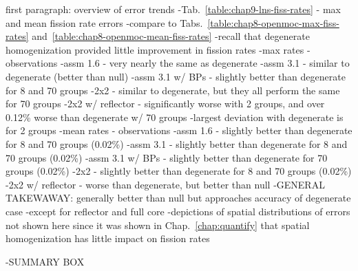 first paragraph: overview of error trends
-Tab.~\ref{table:chap9-lns-fiss-rates} - max and mean fission rate errors
  -compare to Tabs.~\ref{table:chap8-openmoc-max-fiss-rates} and~\ref{table:chap8-openmoc-mean-fiss-rates}
  -recall that degenerate homogenization provided little improvement in fission rates
-max rates - observations
  -assm 1.6 - very nearly the same as degenerate
  -assm 3.1 - similar to degenerate (better than null)
  -assm 3.1 w/ BPs - slightly better than degenerate for 8 and 70 groups
  -2x2 - similar to degenerate, but they all perform the same for 70 groups
  -2x2 w/ reflector - significantly worse with 2 groups, and over 0.12\% worse than degenerate w/ 70 groups
  -largest deviation with degenerate is for 2 groups
-mean rates - observations
  -assm 1.6 - slightly better than degenerate for 8 and 70 groups (0.02\%)
  -assm 3.1 - slightly better than degenerate for 8 and 70 groups (0.02\%)
  -assm 3.1 w/ BPs - slightly better than degenerate for 70 groups (0.02\%)
  -2x2 - slightly better than degenerate for 8 and 70 groups (0.02\%)
  -2x2 w/ reflector - worse than degenerate, but better than null
-GENERAL TAKEWAWAY: generally better than null but approaches accuracy of degenerate case
  -except for reflector and full core
-depictions of spatial distributions of errors not shown here since it was shown in Chap.~\ref{chap:quantify} that spatial homogenization has little impact on fission rates

-SUMMARY BOX

